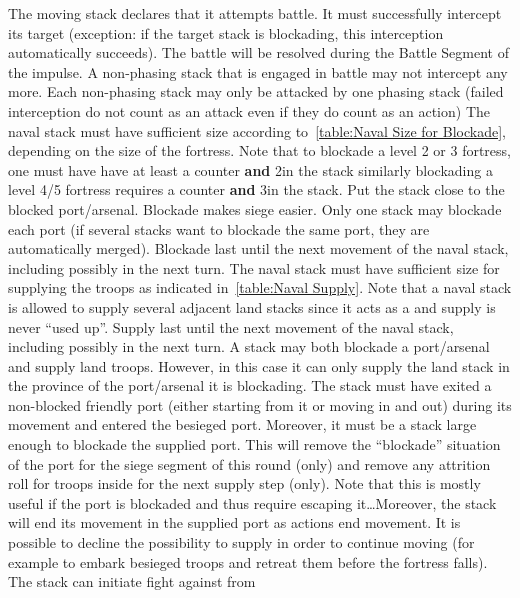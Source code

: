\bparag[Battle.] The moving stack declares that it attempts battle. It must
successfully intercept its target (exception: if the target stack is
blockading, this interception automatically succeeds). The battle will be
resolved during the Battle Segment of the impulse. A non-phasing stack that is
engaged in battle may not intercept any more. Each non-phasing stack may only
be attacked by one phasing stack (failed interception do not count as an
attack even if they do count as an action)
 The naval stack must have
sufficient size according to~\ref{table:Naval Size for Blockade}, depending on
the size of the fortress. Note that to blockade a level 2 or 3 fortress, one
must have have at least a \FLEET\Facemoins counter \textbf{and} 2\ND in the
stack similarly blockading a level 4/5 fortress requires a \FLEET\Faceplus
counter \textbf{and} 3\ND in the stack. Put the stack close to the blocked
port/arsenal. Blockade makes siege easier. Only one stack may blockade each
port (if several stacks want to blockade the same port, they are automatically
merged). Blockade last until the next movement of the naval stack, including
possibly in the next turn.
 The naval stack must have sufficient size for
supplying the troops as indicated in~\ref{table:Naval Supply}. Note that a
naval stack is allowed to supply several adjacent land stacks since it acts as
a \SoS and supply is never ``used up''. Supply last until the next movement of
the naval stack, including possibly in the next turn.
 A stack may both blockade a port/arsenal and
supply land troops. However, in this case it can only supply the land stack in
the province of the port/arsenal it is blockading.
 The stack must have exited a non-blocked
friendly port (either starting from it or moving in and out) during its
movement and entered the besieged port. Moreover, it must be a stack large
enough to blockade the supplied port. This will remove the ``blockade''
situation of the port for the siege segment of this round (only) and remove
any attrition roll for troops inside for the next supply step (only). Note
that this is mostly useful if the port is blockaded and thus require escaping
it\ldots Moreover, the stack will end its movement in the supplied port as
actions end movement. It is possible to decline the possibility to supply in
order to continue moving (for example to embark besieged troops and retreat
them before the fortress falls).
 The stack can initiate fight against \corsaire from
